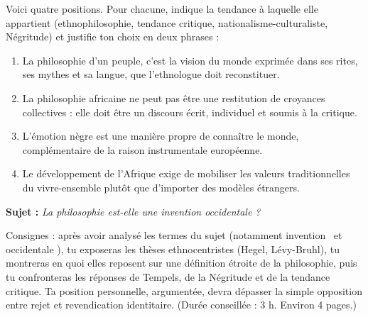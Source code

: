 \documentclass[11pt]{article}
\newcounter{popsec}
\newcounter{popsub}
\newcommand{\courssub}[1]{%
  \stepcounter{popsub}%
  \par\vspace{9pt}\noindent{\popxbold\fontsize{11.5}{13}\selectfont\color{popink}{\color{poporange}\thepopsec.\thepopsub}\hspace{6pt}#1}\par\nopagebreak\vspace{4pt}
}
\begin{document}
\begin{exercice}
Voici quatre positions. Pour chacune, indique la tendance à laquelle elle appartient (ethnophilosophie, tendance critique, nationalisme-culturaliste, Négritude) et justifie ton choix en deux phrases :
\begin{enumerate}
\item \guillemotleft La philosophie d'un peuple, c'est la vision du monde exprimée dans ses rites, ses mythes et sa langue, que l'ethnologue doit reconstituer. \guillemotright
\item \guillemotleft La philosophie africaine ne peut pas être une restitution de croyances collectives : elle doit être un discours écrit, individuel et soumis à la critique. \guillemotright
\item \guillemotleft L'émotion nègre est une manière propre de connaître le monde, complémentaire de la raison instrumentale européenne. \guillemotright
\item \guillemotleft Le développement de l'Afrique exige de mobiliser les valeurs traditionnelles du vivre-ensemble plutôt que d'importer des modèles étrangers. \guillemotright
\end{enumerate}
\end{exercice}

\courssub{Je me prépare au Bac}

\begin{exercice}
\textbf{Sujet :} \emph{La philosophie est-elle une invention occidentale ?}

\medskip
Consignes : après avoir analysé les termes du sujet (notamment \guillemotleft invention \guillemotright\ et \guillemotleft occidentale \guillemotright), tu exposeras les thèses ethnocentristes (Hegel, Lévy-Bruhl), tu montreras en quoi elles reposent sur une définition étroite de la philosophie, puis tu confronteras les réponses de Tempels, de la Négritude et de la tendance critique. Ta position personnelle, argumentée, devra dépasser la simple opposition entre rejet et revendication identitaire. (Durée conseillée : 3 h. Environ 4 pages.)
\end{exercice}
\end{document}
